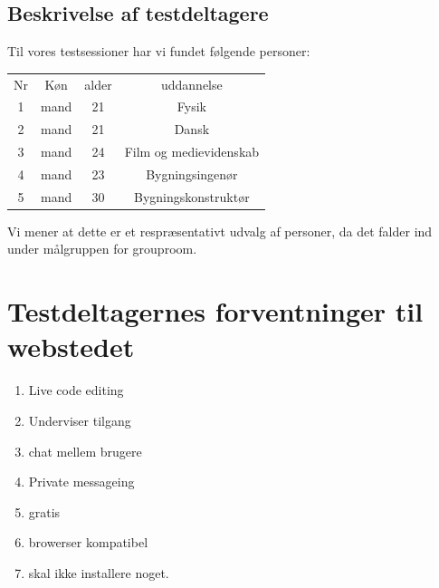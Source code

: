 \documentclass[12pt]{article}
\begin{document}
\subsection{Beskrivelse af testdeltagere}
Til vores testsessioner har vi fundet følgende personer:
\begin{center}
  \begin{tabular}{*{4}{|c}|}
    \hline
    Nr & Køn & alder & uddannelse \\
    1 & mand & 21 & Fysik \\
    2 & mand & 21 & Dansk \\
    3 & mand & 24 & Film og medievidenskab \\
    4 & mand & 23 & Bygningsingenør\\
    5 & mand & 30 & Bygningskonstruktør\\
    \hline
  \end{tabular}
\end{center}
Vi mener at dette er et respræsentativt udvalg af personer, da det falder ind under målgruppen for grouproom.
\section{Testdeltagernes forventninger til webstedet}
\begin{enumerate}
  \item Live code editing 
  \item Underviser tilgang 
  \item chat mellem brugere 
  \item Private messageing 
  \item gratis 
  \item browerser kompatibel
  \item skal ikke installere noget. 
\end{enumerate}
\end{document}
